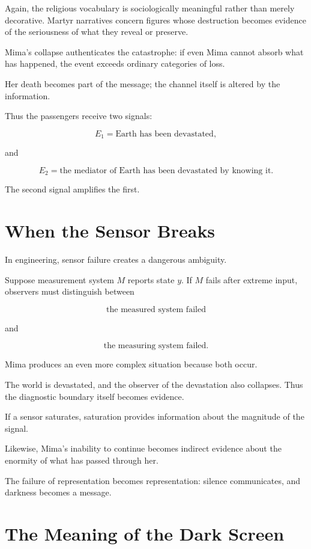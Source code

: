 \documentclass[11pt,oneside]{book}
\theoremstyle{definition}
\theoremstyle{remark}
\begin{document}
Again, the religious vocabulary is sociologically meaningful rather than merely decorative. Martyr narratives concern figures whose destruction becomes evidence of the seriousness of what they reveal or preserve.

Mima's collapse authenticates the catastrophe: if even Mima cannot absorb what has happened, the event exceeds ordinary categories of loss.

Her death becomes part of the message; the channel itself is altered by the information.

Thus the passengers receive two signals:

\[
E_1
=
\text{Earth has been devastated},
\]

and

\[
E_2
=
\text{the mediator of Earth has been devastated by knowing it}.
\]

The second signal amplifies the first.

\section{When the Sensor Breaks}

In engineering, sensor failure creates a dangerous ambiguity.

Suppose measurement system \(M\) reports state \(y\). If \(M\) fails after extreme input, observers must distinguish between

\[
\text{the measured system failed}
\]

and

\[
\text{the measuring system failed}.
\]

Mima produces an even more complex situation because both occur.

The world is devastated, and the observer of the devastation also collapses. Thus the diagnostic boundary itself becomes evidence.

If a sensor saturates, saturation provides information about the magnitude of the signal.

Likewise, Mima's inability to continue becomes indirect evidence about the enormity of what has passed through her.

The failure of representation becomes representation: silence communicates, and darkness becomes a message.

\section{The Meaning of the Dark Screen}
\end{document}
